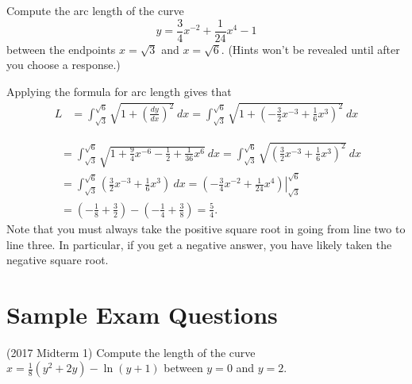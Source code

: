 \documentclass{ximera}
\begin{document}
\begin{question}%

Compute the arc length of the curve \[y = \frac{3}{4}x^{-2} + \frac{1}{24}x^{4} - 1\] between the endpoints \(x = \sqrt{3}\) and \(x = \sqrt{6}\).
(Hints won't be revealed until after you choose a response.)
\begin{multiplechoice}
\end{multiplechoice}
\begin{feedback}
Applying the formula for arc length gives that
\[
\begin{aligned}
L & = \int_{\sqrt{3}}^{\sqrt{6}} \sqrt{1 + \left( \frac{dy}{dx} \right)^2}~dx 
   = \int_{\sqrt{3}}^{\sqrt{6}} \sqrt{1 + \left( -\frac{3}{2}x^{-3} + \frac{1}{6}x^{3} \right)^2}~dx
\end{aligned}
\]
\begin{hint}
\[
\begin{aligned}
  & = \int_{\sqrt{3}}^{\sqrt{6}} \sqrt{1 + \frac{9}{4}x^{-6} - \frac{1}{2} + \frac{1}{36}x^{6}} ~ dx 
   = \int_{\sqrt{3}}^{\sqrt{6}} \sqrt{ \left( \frac{3}{2}x^{-3} + \frac{1}{6}x^{3} \right)^2} ~ dx \\
  & = \int_{\sqrt{3}}^{\sqrt{6}} \left( \frac{3}{2}x^{-3} + \frac{1}{6}x^{3} \right) ~ dx 
   = \left.  \left( -\frac{3}{4}x^{-2} + \frac{1}{24}x^{4} \right) \right|_{\sqrt{3}}^{\sqrt{6}} \\
  & =  \left( -\frac{1}{8} + \frac{3}{2} \right) - \left( -\frac{1}{4} + \frac{3}{8} \right) 
   = \frac{5}{4}.
\end{aligned}
\]
Note that you must always take the positive square root in going from line two to line three. In particular, if you get a negative answer, you have likely taken the negative square root.
\end{hint}
\end{feedback}

\end{question}

\section*{Sample Exam Questions}

\begin{question}(2017 Midterm 1)
Compute the length of the curve $x = \frac{1}{8} (y^2 + 2y) - \ln (y+1)$ between $y=0$ and $y = 2$.
\begin{multipleChoice}
\end{multipleChoice}
\end{question}
\end{document}
